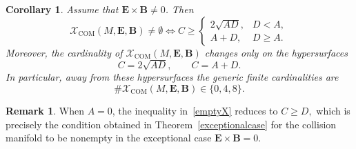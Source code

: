 \documentclass[12pt]{article}
\theoremstyle{plain}
\newtheorem{corollary}[theorem]{Corollary}
\theoremstyle{definition}
\newtheorem{remark}[theorem]{Remark}
\begin{document}
\begin{corollary}\label{nonemptycondition}
Assume that ${\bm E}\times{\bm B}\neq0$. Then
\begin{equation}\label{emptyX}
\mathcal X_{\mathrm{COM}}(M,{\bm E},{\bm B})\neq\emptyset
\iff
C\ge
\begin{cases}
2\sqrt{AD}, & D<A,\\
A+D, & D\ge A.
\end{cases}
\end{equation}
Moreover, the cardinality of $\mathcal X_{\mathrm{COM}}(M,{\bm E},{\bm B})$ changes only on the hypersurfaces
\[
C=2\sqrt{AD},
\qquad
C=A+D.
\]
In particular, away from these hypersurfaces the generic finite cardinalities are
\[
\#\mathcal X_{\mathrm{COM}}(M,{\bm E},{\bm B})\in\{0,4,8\}.
\]
\end{corollary}
\begin{remark}
When $A=0$, the inequality in~\eqref{emptyX} reduces to
$
C\ge D,
$
which is precisely the condition obtained in Theorem~\ref{exceptionalcase}
for the collision manifold to be nonempty in the exceptional case
${\bm E}\times{\bm B}=0$.
\end{remark}
\end{document}
